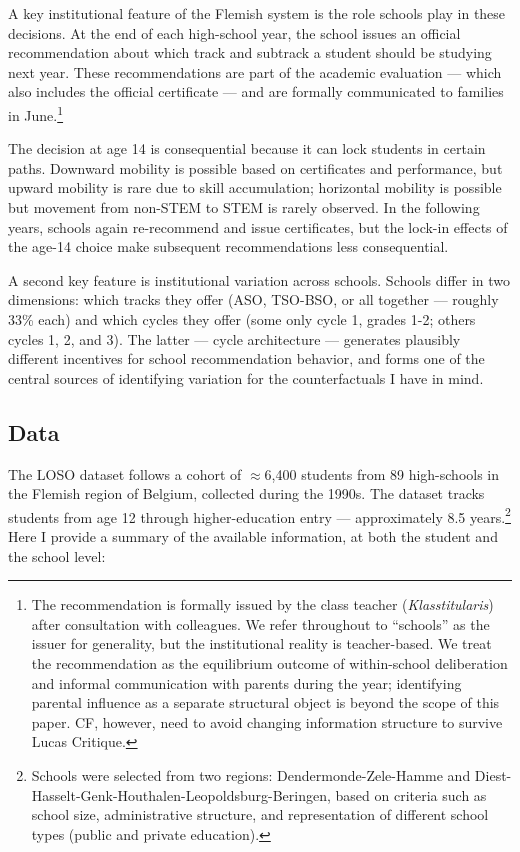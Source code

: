 \documentclass{article}
\begin{document}
A key institutional feature of the Flemish system is the role schools play in these decisions. At the end of each high-school year, the school issues an official recommendation about which track and subtrack a student should be studying next year. These recommendations are part of the academic evaluation --- which also includes the official certificate --- and are formally communicated to families in June.\footnote{The recommendation is formally issued by the class teacher (\textit{Klasstitularis}) after consultation with colleagues. We refer throughout to ``schools'' as the issuer for generality, but the institutional reality is teacher-based. We treat the recommendation as the equilibrium outcome of within-school deliberation and informal communication with parents during the year; identifying parental influence as a separate structural object is beyond the scope of this paper. CF, however, need to avoid changing information structure to survive Lucas Critique.}

The decision at age 14 is consequential because it can lock students in certain paths. Downward mobility is possible based on certificates and performance, but upward mobility is rare due to skill accumulation; horizontal mobility is possible but movement from non-STEM to STEM is rarely observed. In the following years, schools again re-recommend and issue certificates, but the lock-in effects of the age-14 choice make subsequent recommendations less consequential.

A second key feature is institutional variation across schools. Schools differ in two dimensions: which tracks they offer (ASO, TSO-BSO, or all together --- roughly 33\% each) and which cycles they offer (some only cycle 1, grades 1-2; others cycles 1, 2, and 3). The latter --- cycle architecture --- generates plausibly different incentives for school recommendation behavior, and forms one of the central sources of identifying variation for the counterfactuals I have in mind.

\subsection{Data}

The LOSO dataset follows a cohort of \(\approx\)6,400 students from 89 high-schools in the Flemish region of Belgium, collected during the 1990s. The dataset tracks students from age 12 through higher-education entry --- approximately 8.5 years.\footnote{Schools were selected from two regions: Dendermonde-Zele-Hamme and Diest-Hasselt-Genk-Houthalen-Leopoldsburg-Beringen, based on criteria such as school size, administrative structure, and representation of different school types (public and private education).} Here I provide a summary of the available information, at both the student and the school level:
\end{document}
